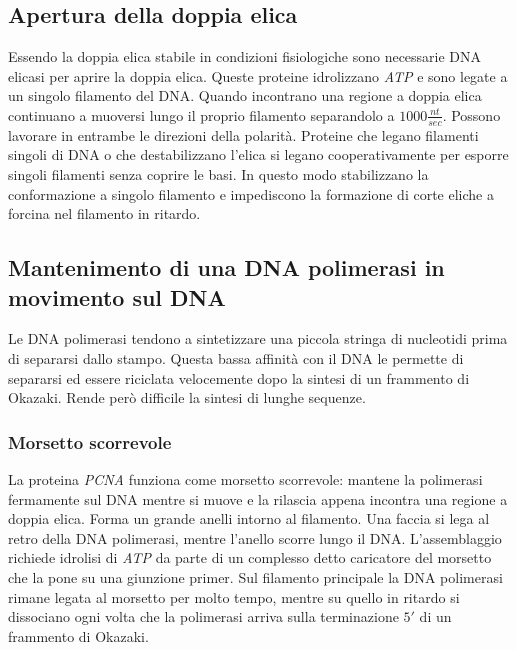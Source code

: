 	\subsection{Apertura della doppia elica}
	Essendo la doppia elica stabile in condizioni fisiologiche sono necessarie DNA elicasi per aprire la doppia elica.
	Queste proteine idrolizzano \emph{ATP} e sono legate a un singolo filamento del DNA.
	Quando incontrano una regione a doppia elica continuano a muoversi lungo il proprio filamento separandolo a $1000\frac{nt}{sec}$.
	Possono lavorare in entrambe le direzioni della polarit\`a.
	Proteine che legano filamenti singoli di DNA o che destabilizzano l'elica si legano cooperativamente per esporre singoli filamenti senza coprire le basi.
	In questo modo stabilizzano la conformazione a singolo filamento e impediscono la formazione di corte eliche a forcina nel filamento in ritardo.

	\subsection{Mantenimento di una DNA polimerasi in movimento sul DNA}
	Le DNA polimerasi tendono a sintetizzare una piccola stringa di nucleotidi prima di separarsi dallo stampo.
	Questa bassa affinit\`a con il DNA le permette di separarsi ed essere riciclata velocemente dopo la sintesi di un frammento di Okazaki.
	Rende per\`o difficile la sintesi di lunghe sequenze.

		\subsubsection{Morsetto scorrevole}
		La proteina \emph{PCNA} funziona come morsetto scorrevole: mantene la polimerasi fermamente sul DNA mentre si muove e la rilascia appena incontra una regione a doppia elica.
		Forma un grande anelli intorno al filamento.
		Una faccia si lega al retro della DNA polimerasi, mentre l'anello scorre lungo il DNA.
		L'assemblaggio richiede idrolisi di \emph{ATP} da parte di un complesso detto caricatore del morsetto che la pone su una giunzione primer.
		Sul filamento principale la DNA polimerasi rimane legata al morsetto per molto tempo, mentre su quello in ritardo si dissociano ogni volta che la polimerasi arriva sulla terminazione $5'$ di un frammento di Okazaki.


